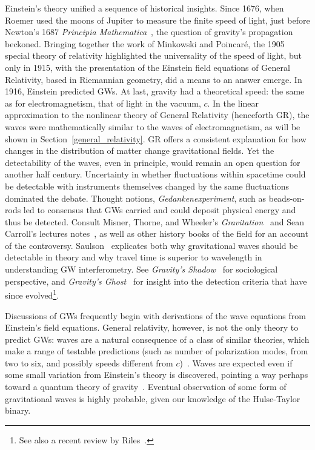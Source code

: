         Einstein's theory unified a sequence of historical insights. 
Since 1676, when Roemer used the moons of Jupiter to measure the finite speed of light, just before Newton's 1687 \textit{Principia Mathematica}~\cite{Hawking2002}, the question of gravity's propagation beckoned. 
Bringing together the work of Minkowski and Poincar\'{e}, the 1905 special theory of relativity highlighted the universality of the speed of light, but only in 1915, with the presentation of the Einstein field equations of General Relativity, based in Riemannian geometry, did a means to an answer emerge. 
In 1916, Einstein predicted GWs. 
At last, gravity had a theoretical speed: the same as for electromagnetism, that of light in the vacuum, $c$.
In the linear approximation to the nonlinear theory of General Relativity (henceforth GR), the waves were mathematically similar to the waves of electromagnetism, as will be shown in Section~\ref{general_relativity}.
GR offers a consistent explanation for how changes in the distribution of matter change gravitational fields.
Yet the detectability of the waves, even in principle, would remain an open question for another half century. 
Uncertainty in whether fluctuations within spacetime could be detectable with instruments themselves changed by the same fluctuations dominated the debate. %
Thought notions, \textit{Gedankenexperiment}, such as beads-on-rods led to consensus that GWs carried and could deposit physical energy and thus be detected. 
Consult Misner, Thorne, and Wheeler's \textit{Gravitation}~\cite{MisnerThorneWheeler} and Sean Carroll's lectures notes~\cite{Carroll1997}, as well as other history books of the field for an account of the controversy.
Saulson~\cite{Saulson1997} explicates both why gravitational waves should be detectable in theory and why travel time is superior to wavelength in understanding GW interferometry.
See \textit{Gravity's Shadow}~\cite{CollinsGravityShadow} for sociological perspective, and 
\textit{Gravity's Ghost}~\cite{CollinsGravityGhost} for insight into the detection criteria that have since evolved\footnote{See also a recent review by Riles~\cite{Riles2013}.}.

Discussions of GWs frequently begin with derivations of the wave equations from Einstein's field equations. 
General relativity, however, is not the only theory to predict GWs: waves are a natural consequence of a class of similar theories, which make a range of testable predictions (such as number of polarization modes, from two to six, and possibly speeds different from $c$)~\cite{Will1993}. 
Waves are expected even if some small variation from Einstein's theory is discovered, pointing a way perhaps toward a quantum theory of gravity~\cite{Sathyaprakash2009}. 
Eventual observation of some form of gravitational waves is highly probable, given our knowledge of the Hulse-Taylor binary.

